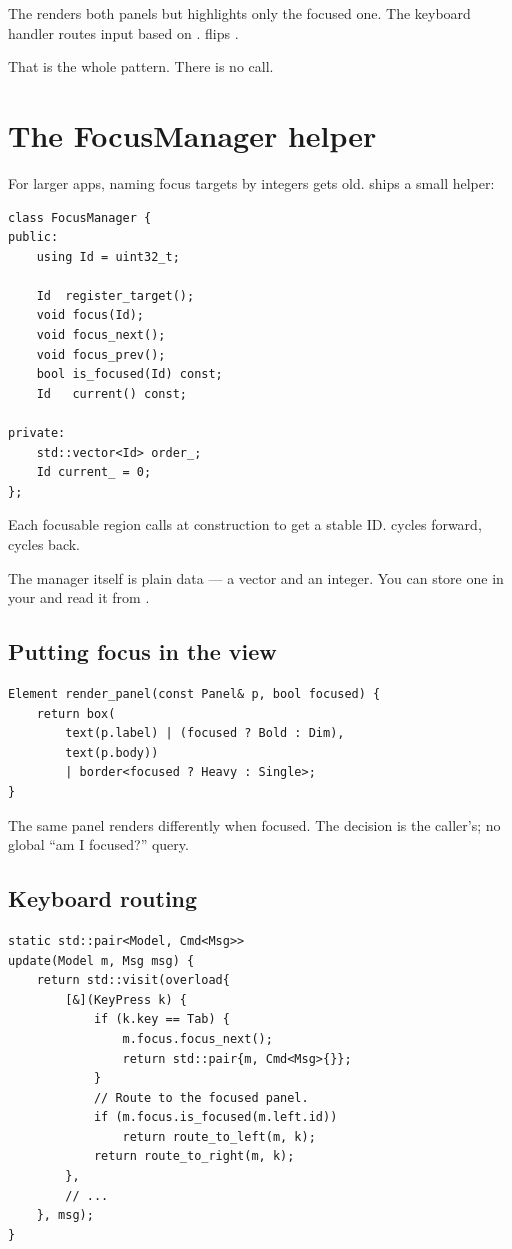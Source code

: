 The  renders both panels but highlights only the
focused one. The keyboard handler routes input based on
.  flips .

That is the whole pattern. There is no 
call.

\section{The FocusManager helper}

For larger apps, naming focus targets by integers gets old.
 ships a small helper:

\begin{lstlisting}
class FocusManager {
public:
    using Id = uint32_t;

    Id  register_target();
    void focus(Id);
    void focus_next();
    void focus_prev();
    bool is_focused(Id) const;
    Id   current() const;

private:
    std::vector<Id> order_;
    Id current_ = 0;
};
\end{lstlisting}

Each focusable region calls  at
construction to get a stable ID.  cycles
forward,  cycles back.

The manager itself is plain data --- a vector and an integer.
You can store one in your  and read it from
.

\subsection*{Putting focus in the view}

\begin{lstlisting}
Element render_panel(const Panel& p, bool focused) {
    return box(
        text(p.label) | (focused ? Bold : Dim),
        text(p.body))
        | border<focused ? Heavy : Single>;
}
\end{lstlisting}

The same panel renders differently when focused. The decision is
the caller's; no global ``am I focused?'' query.

\subsection*{Keyboard routing}

\begin{lstlisting}
static std::pair<Model, Cmd<Msg>>
update(Model m, Msg msg) {
    return std::visit(overload{
        [&](KeyPress k) {
            if (k.key == Tab) {
                m.focus.focus_next();
                return std::pair{m, Cmd<Msg>{}};
            }
            // Route to the focused panel.
            if (m.focus.is_focused(m.left.id))
                return route_to_left(m, k);
            return route_to_right(m, k);
        },
        // ...
    }, msg);
}
\end{lstlisting}


